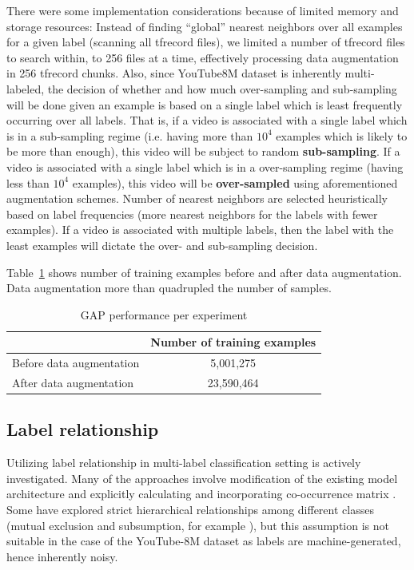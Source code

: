 \documentclass[runningheads]{llncs}
\begin{document}
There were some implementation considerations because of limited memory and storage resources: Instead of finding ``global'' nearest neighbors over all examples for a given label (scanning all tfrecord files), we limited a number of tfrecord files to search within, to 256 files at a time, effectively processing data augmentation in 256 tfrecord chunks.
Also, since YouTube8M dataset is inherently multi-labeled, the decision of whether and how much over-sampling and sub-sampling will be done given an example is based on a single label which is least frequently occurring over all labels.
That is, if a video is associated with a single label which is in a sub-sampling regime (i.e. having more than $10^4$ examples which is likely to be more than enough), this video will be subject to random \textbf{sub-sampling}.
If a video is associated with a single label which is in a over-sampling regime (having less than $10^4$ examples), this video will be \textbf{over-sampled} using aforementioned augmentation schemes.
Number of nearest neighbors are selected heuristically based on label frequencies (more nearest neighbors for the labels with fewer examples).
If a video is associated with multiple labels, then the label with the least examples will dictate the over- and sub-sampling decision.

Table~\ref{tab:aug_num_samples} shows number of training examples before and after data augmentation.
Data augmentation more than quadrupled the number of samples.

\begin{table}[h!]
  \begin{center}
    \caption{GAP performance per experiment}
    \label{tab:aug_num_samples}

    \begin{tabular}{ l | c }
       & Number of training examples  \\
    \hline
    \hline
      Before data augmentation & 5,001,275  \\
    \hline
      After data augmentation & 23,590,464 \\
    \end{tabular}
  \end{center}
\end{table}

\subsection{Label relationship} \label{sub:label_relationship}
Utilizing label relationship in multi-label classification setting is actively investigated.
Many of the approaches involve modification of the existing model architecture and explicitly calculating and incorporating co-occurrence matrix \cite{rabinovich2007}\cite{bengio2013}.
Some have explored strict hierarchical relationships among different classes (mutual exclusion and subsumption, for example \cite{deng2014}), but this assumption is not suitable in the case of the YouTube-8M dataset as labels are machine-generated, hence inherently noisy.
\end{document}
